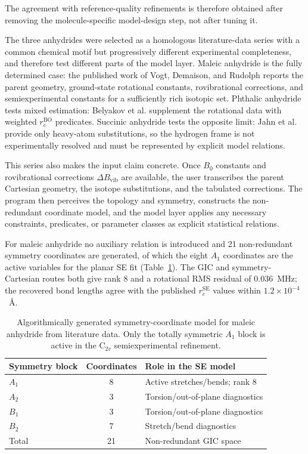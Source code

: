 \documentclass[aip,jcp,reprint,longbibliography,floatfix]{revtex4-2}
\begin{document}
The agreement with reference-quality refinements is therefore obtained after
removing the molecule-specific model-design step, not after tuning it.

The three anhydrides were selected as a homologous literature-data series
with a common chemical motif but progressively
different experimental completeness, and therefore test different parts of
the model layer. Maleic anhydride is the fully determined case: the published
work of Vogt, Demaison, and Rudolph\cite{Vogt2011MaleicAnhydride} reports the
parent geometry, ground-state rotational constants, rovibrational corrections,
and semiexperimental constants for a sufficiently rich isotopic set. Phthalic
anhydride tests mixed estimation: Belyakov et
al.\cite{Belyakov2022PhthalicAnhydride} supplement the rotational data with
weighted $r_e^\mathrm{BO}$ predicates. Succinic anhydride tests the opposite
limit: Jahn et al.\cite{Jahn2020SuccinicAnhydride} provide only heavy-atom
substitutions, so the hydrogen frame is not experimentally resolved and must be
represented by explicit model relations.

This series also makes the input claim concrete. Once $B_0$ constants and
rovibrational corrections $\Delta B_\mathrm{vib}$ are available, the
user transcribes the parent Cartesian geometry, the isotope
substitutions, and the tabulated corrections. The program then perceives the
topology and symmetry, constructs the non-redundant coordinate model, and
the model layer applies any necessary constraints, predicates, or parameter
classes as explicit statistical relations.

For maleic anhydride no auxiliary relation is introduced and 21
non-redundant symmetry coordinates are generated, of which the eight $A_1$ coordinates are
the active variables for the planar SE fit (Table~\ref{tab:maleic-symmetry-gics}).
The GIC and symmetry-Cartesian routes both give rank 8 and a rotational RMS
residual of 0.036~MHz; the recovered bond lengths agree with the published
$r_e^\mathrm{SE}$ values within $1.2\times10^{-4}$~\AA.

\begin{table}[t]
\caption{Algorithmically generated symmetry-coordinate model for maleic
anhydride from literature data. Only the totally symmetric $A_1$ block is
active in the C$_{2v}$ semiexperimental refinement.}
\label{tab:maleic-symmetry-gics}
\scriptsize
\setlength{\tabcolsep}{4pt}
\begin{tabular}{@{}lcl@{}}
\toprule
Symmetry block & Coordinates & Role in the SE model \\
\midrule
$A_1$ & 8 & Active stretches/bends; rank 8 \\
$A_2$ & 3 & Torsion/out-of-plane diagnostics \\
$B_1$ & 3 & Torsion/out-of-plane diagnostics \\
$B_2$ & 7 & Stretch/bend diagnostics \\
\midrule
Total & 21 & Non-redundant GIC space \\
\bottomrule
\end{tabular}
\end{table}
\end{document}
